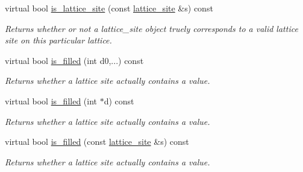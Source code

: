 \begin{DoxyCompactItemize}
\mbox{\label{classsisl_1_1body__centered__cubic_a5347e1116144be97551c3baac90bc75d}} 
virtual bool \hyperlink{classsisl_1_1body__centered__cubic_a5347e1116144be97551c3baac90bc75d}{is\+\_\+lattice\+\_\+site} (const \hyperlink{namespacesisl_acd18feee4026583db6185df2b25434aa}{lattice\+\_\+site} \&s) const
\begin{DoxyCompactList}\small\item\em Returns whether or not a lattice\+\_\+site object truely corresponds to a valid lattice site on this particular lattice. \end{DoxyCompactList}\item 
\mbox{\label{classsisl_1_1body__centered__cubic_ae892bd04e5b649a6aa48dc4f464d0f69}} 
virtual bool \hyperlink{classsisl_1_1body__centered__cubic_ae892bd04e5b649a6aa48dc4f464d0f69}{is\+\_\+filled} (int d0,...) const
\begin{DoxyCompactList}\small\item\em Returns whether a lattice site actually contains a value. \end{DoxyCompactList}\item 
\mbox{\label{classsisl_1_1body__centered__cubic_a8f40907ff91829e226bf224525b984b3}} 
virtual bool \hyperlink{classsisl_1_1body__centered__cubic_a8f40907ff91829e226bf224525b984b3}{is\+\_\+filled} (int $\ast$d) const
\begin{DoxyCompactList}\small\item\em Returns whether a lattice site actually contains a value. \end{DoxyCompactList}\item 
\mbox{\label{classsisl_1_1body__centered__cubic_a1c60cd88d4ecd4d224cc198fa52dad44}} 
virtual bool \hyperlink{classsisl_1_1body__centered__cubic_a1c60cd88d4ecd4d224cc198fa52dad44}{is\+\_\+filled} (const \hyperlink{namespacesisl_acd18feee4026583db6185df2b25434aa}{lattice\+\_\+site} \&s) const
\begin{DoxyCompactList}\small\item\em Returns whether a lattice site actually contains a value. \end{DoxyCompactList}\item 
\mbox{\label{classsisl_1_1body__centered__cubic_ae46befbb818394f332b938d3b669581c}} 

\end{DoxyCompactItemize}
